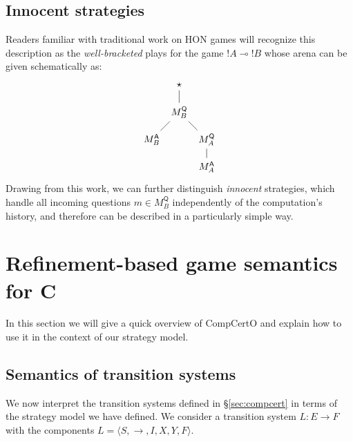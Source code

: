 \documentclass[format=sigplan,authordraft]{acmart}
\newcommand{\kw}[1]{\ensuremath{\mathsf{#1}}}
\begin{document}

\subsection{Innocent strategies} %

Readers familiar with traditional work on HON games \cite{something}
will recognize this description
as the \emph{well-bracketed} plays for the game ${!}A \multimap {!}B$
whose arena can be given schematically as:
\[
  \begin{tikzpicture}
    \node (S) at (0,3) {$\star$};
    \node (BQ) at (0,2) {$M_B^\kw{Q}$};
    \node (BA) at (-1,1) {$M_B^\kw{A}$};
    \node (AQ) at (+1,1) {$M_A^\kw{Q}$};
    \node (AA) at (+1,0) {$M_A^\kw{A}$};
    \path (S) edge (BQ);
    \path (BQ) edge (BA);
    \path (BQ) edge (AQ);
    \path (AQ) edge (AA);
  \end{tikzpicture}
\]
Drawing from this work,
we can further distinguish \emph{innocent} strategies,
which handle all incoming questions $m \in M_B^\kw{Q}$
independently of the computation's history,
and therefore can be described in a particularly simple way.









\section{Refinement-based game semantics for C} %

In this section we will give a quick overview of CompCertO
and explain how to use it in the context of our strategy model.

\subsection{Semantics of transition systems} %

We now interpret the transition systems defined in \S\ref{sec:compcert}
in terms of the strategy model we have defined.
We consider a transition system $L : E \rightarrow F$
with the components $L = \langle S, {\rightarrow}, I, X, Y, F \rangle$.
\end{document}
